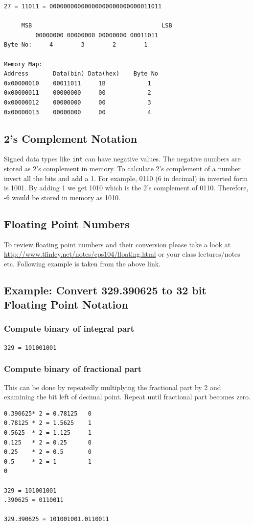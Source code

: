 \documentclass{article}
\begin{document}
\begin{verbatim}
27 = 11011 = 00000000000000000000000000011011

     MSB                                     LSB
         00000000 00000000 00000000 00011011
Byte No:     4        3        2        1

Memory Map:
Address       Data(bin) Data(hex)    Byte No
0x00000010    00011011     1B            1
0x00000011    00000000     00            2
0x00000012    00000000     00            3
0x00000013    00000000     00            4
\end{verbatim}


\subsection{2's Complement Notation}
Signed data types like \verb|int| can have negative values. The negative numbers are stored as 2's complement in memory. To calculate 2's complement of a number invert all the bits and add a 1. For example, 0110 (6 in decimal) in inverted form is 1001. By adding 1 we get 1010 which is the 2's complement of 0110. Therefore, -6 would be stored in memory as 1010.

\subsection{Floating Point Numbers}
To review floating point numbers and their conversion please take a look at \url{http://www.tfinley.net/notes/cps104/floating.html} or your class lectures/notes etc. Following example is taken from the above link.
\subsection{Example: Convert 329.390625 to 32 bit Floating Point Notation}
\subsubsection{Compute binary of integral part}
\verb|329 = 101001001|
\subsubsection{Compute binary of fractional part}
This can be done by repeatedly multiplying the fractional part by 2 and examining the bit left of decimal point. Repeat until fractional part becomes zero.
\begin{verbatim}
0.390625* 2 = 0.78125   0
0.78125 * 2 = 1.5625    1
0.5625  * 2 = 1.125     1
0.125   * 2 = 0.25      0
0.25    * 2 = 0.5       0
0.5     * 2 = 1         1
0

329 = 101001001
.390625 = 0110011

329.390625 = 101001001.0110011
\end{verbatim}
\end{document}
